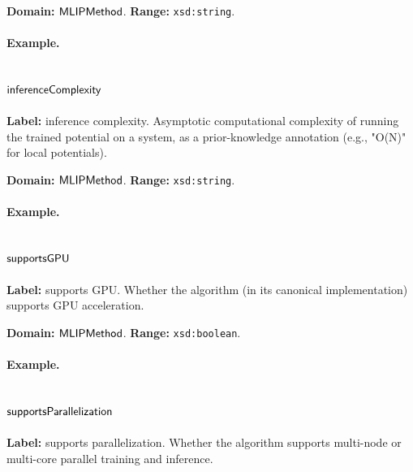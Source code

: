 \textbf{Domain:} $\mathsf{MLIPMethod}$.
\textbf{Range:} \texttt{xsd:string}.

\paragraph{Example.}

\subsection{$\mathsf{inferenceComplexity}$}
\label{sec:term-inferenceComplexity}

\textbf{Label:} inference complexity.
Asymptotic computational complexity of running the trained potential on a system, as a prior-knowledge annotation (e.g., "O(N)" for local potentials).

\textbf{Domain:} $\mathsf{MLIPMethod}$.
\textbf{Range:} \texttt{xsd:string}.

\paragraph{Example.}

\subsection{$\mathsf{supportsGPU}$}
\label{sec:term-supportsGPU}

\textbf{Label:} supports GPU.
Whether the algorithm (in its canonical implementation) supports GPU acceleration.

\textbf{Domain:} $\mathsf{MLIPMethod}$.
\textbf{Range:} \texttt{xsd:boolean}.

\paragraph{Example.}

\subsection{$\mathsf{supportsParallelization}$}
\label{sec:term-supportsParallelization}

\textbf{Label:} supports parallelization.
Whether the algorithm supports multi-node or multi-core parallel training and inference.

